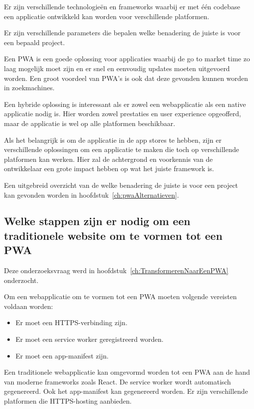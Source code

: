 		Er zijn verschillende technologieën en frameworks waarbij er met één codebase een applicatie ontwikkeld kan worden voor verschillende platformen. 
		
		Er zijn verschillende parameters die bepalen welke benadering de juiste is voor een bepaald project. 
	
		Een PWA is een goede oplossing voor applicaties waarbij de go to market time zo laag mogelijk moet zijn en er snel en eenvoudig updates moeten uitgevoerd worden. Een groot voordeel van PWA's is ook dat deze gevonden kunnen worden in zoekmachines.
		
		Een hybride oplossing is interessant als er zowel een webapplicatie als een native applicatie nodig is. Hier worden zowel prestaties en user experience opgeofferd, maar de applicatie is wel op alle platformen beschikbaar. 
		
		Als het belangrijk is om de applicatie in de app stores te hebben, zijn er verschillende oplossingen om een applicatie te maken die toch op verschillende platformen kan werken. Hier zal de achtergrond en voorkennis van de ontwikkelaar een grote impact hebben op wat het juiste framework is. 
		
		Een uitgebreid overzicht van de welke benadering de juiste is voor een project kan gevonden worden in hoofdstuk~\ref{ch:pwaAlternatieven}.
	
	\subsection{Welke stappen zijn er nodig om een traditionele website om te vormen tot een PWA}
		
		Deze onderzoeksvraag werd in hoofdstuk~\ref{ch:TransformerenNaarEenPWA} onderzocht. 
		
		Om een webapplicatie om te vormen tot een PWA moeten volgende vereisten voldaan worden:
		\begin{itemize}
			\item	Er moet een HTTPS-verbinding zijn.
			\item	Er moet een service worker geregistreerd worden.
			\item	Er moet een app-manifest zijn.
		\end{itemize}
		
		Een traditionele webapplicatie kan omgevormd worden tot een PWA aan de hand van moderne frameworks zoals React. 
		De service worker wordt automatisch gegenereerd. Ook het app-manifest kan gegenereerd worden. Er zijn verschillende platformen die HTTPS-hosting aanbieden. 
		
